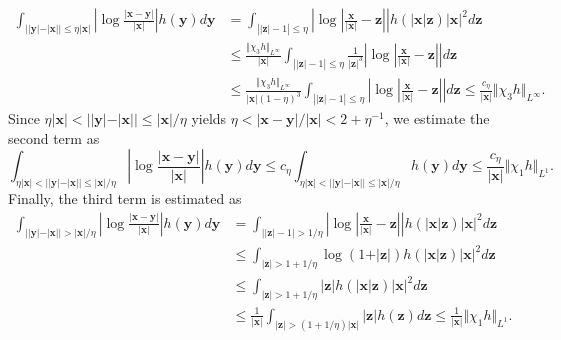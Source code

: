 \documentclass{article}
\theoremstyle{definition}
\begin{document}
\begin{align*}
\int_{ \vert\vert{\bm y}\vert - \vert{\bm x}\vert\vert \leq \eta \vert{\bm x}\vert} \left\vert \log{\frac{\vert{\bm x} - {\bm y}\vert}{\vert{\bm x}\vert}} \right\vert h({\bm y}) d{\bm y} &= \int_{\left\vert \vert{\bm z}\vert - 1 \right\vert \leq \eta} \left\vert \log{ \left\vert\frac{{\bm x}}{\vert{\bm x}\vert} - {\bm z} \right\vert} \right\vert h(\vert{\bm x}\vert{\bm z}) \vert{\bm x}\vert^2 d{\bm z} \\
&\leq \frac{\Vert \chi_3 h \Vert_{L^\infty}}{\vert{\bm x}\vert} \int_{ \left\vert \vert{\bm z}\vert - 1 \right\vert \leq \eta} \frac{1}{\vert{\bm z}\vert^3}\left\vert \log{ \left\vert\frac{{\bm x}}{\vert{\bm x}\vert} - {\bm z} \right\vert} \right\vert d{\bm z} \\
&\leq \frac{\Vert \chi_3 h \Vert_{L^\infty}}{\vert{\bm x}\vert(1 - \eta)^3} \int_{ \left\vert \vert{\bm z}\vert - 1 \right\vert \leq \eta} \left\vert \log{ \left\vert\frac{{\bm x}}{\vert{\bm x}\vert} - {\bm z} \right\vert} \right\vert d{\bm z} \leq \frac{c_\eta}{\vert{\bm x}\vert} \Vert \chi_3 h \Vert_{L^\infty}.
\end{align*}
Since $\eta \vert{\bm x} \vert< \vert\vert {\bm y} \vert - \vert{\bm x}\vert\vert \leq \vert{\bm x}\vert/ \eta $ yields $\eta < \vert{\bm x} - {\bm y}\vert / \vert{\bm x}\vert < 2 + \eta^{-1}$, we estimate the second term as
\[
\int_{ \eta \vert{\bm x}\vert < \vert\vert{\bm y}\vert - \vert{\bm x}\vert\vert \leq \vert{\bm x}\vert/ \eta} \left\vert \log{\frac{\vert{\bm x} - {\bm y}\vert}{\vert{\bm x}\vert}} \right\vert h({\bm y}) d{\bm y} \leq c_\eta \int_{ \eta \vert{\bm x}\vert < \vert\vert{\bm y}\vert - \vert{\bm x}\vert\vert  \leq \vert{\bm x}\vert/ \eta} h({\bm y}) d{\bm y}  \leq \frac{c_\eta}{\vert{\bm x}\vert} \Vert \chi_1 h \Vert_{L^1}.
\]
Finally, the third term is estimated as
\begin{align*}
\int_{ \vert\vert{\bm y}\vert - \vert{\bm x}\vert\vert > \vert{\bm x}\vert/ \eta} \left\vert \log{\frac{\vert{\bm x} - {\bm y}\vert}{\vert{\bm x}\vert}} \right\vert h({\bm y}) d{\bm y} & = \int_{ \vert\vert{\bm z}\vert - 1\vert > 1 / \eta} \left\vert \log{ \left\vert\frac{{\bm x}}{\vert{\bm x}\vert} - {\bm z} \right\vert} \right\vert h( \vert{\bm x}\vert {\bm z}) \vert{\bm x}\vert^2 d{\bm z} \\
&\leq \int_{ \vert{\bm z}\vert > 1 + 1 / \eta}  \log{ \left( 1 + \vert{\bm z}\vert \right) } h( \vert{\bm x}\vert {\bm z}) \vert{\bm x}\vert^2 d{\bm z} \\
&\leq \int_{ \vert{\bm z}\vert > 1 + 1 / \eta} \vert{\bm z}\vert h( \vert{\bm x}\vert {\bm z}) \vert{\bm x}\vert^2 d{\bm z} \\
&\leq \frac{1}{\vert{\bm x}\vert} \int_{ \vert{\bm z}\vert > (1 + 1 / \eta)\vert{\bm x}\vert} \vert{\bm z}\vert h( {\bm z})  d{\bm z} \leq \frac{1}{\vert{\bm x}\vert} \Vert \chi_1 h \Vert_{L^1}.
\end{align*}
\end{document}
